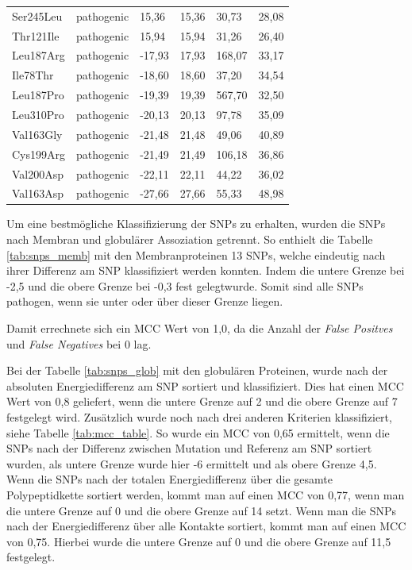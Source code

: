 \begin{table}[]
{\begin{tabular}{llllll}
        Ser245Leu & pathogenic & 15,36 & 15,36 & 30,73 & 28,08 \\
        \rowcolor[HTML]{FFCCC9} 
        Thr121Ile & pathogenic & 15,94 & 15,94 & 31,26 & 26,40 \\
        \rowcolor[HTML]{FFCCC9} 
        Leu187Arg & pathogenic & -17,93 & 17,93 & 168,07 & 33,17 \\
        \rowcolor[HTML]{FFCCC9} 
        Ile78Thr & pathogenic & -18,60 & 18,60 & 37,20 & 34,54 \\
        \rowcolor[HTML]{FFCCC9} 
        Leu187Pro & pathogenic & -19,39 & 19,39 & 567,70 & 32,50 \\
        \rowcolor[HTML]{FFCCC9} 
        Leu310Pro & pathogenic & -20,13 & 20,13 & 97,78 & 35,09 \\
        \rowcolor[HTML]{FFCCC9} 
        Val163Gly & pathogenic & -21,48 & 21,48 & 49,06 & 40,89 \\
        \rowcolor[HTML]{FFCCC9} 
        Cys199Arg & pathogenic & -21,49 & 21,49 & 106,18 & 36,86 \\
        \rowcolor[HTML]{FFCCC9} 
        Val200Asp & pathogenic & -22,11 & 22,11 & 44,22 & 36,02 \\
        \rowcolor[HTML]{FFCCC9} 
        Val163Asp & pathogenic & -27,66 & 27,66 & 55,33 & 48,98
    \end{tabular}}
\end{table}

Um eine bestmögliche Klassifizierung der \ac{SNP}s zu erhalten, wurden die \ac{SNP}s nach Membran und globulärer Assoziation getrennt. So enthielt die Tabelle \ref{tab:snps_memb} mit den Membranproteinen 13 \ac{SNP}s, welche eindeutig nach ihrer Differenz am \ac{SNP} klassifiziert werden konnten. Indem die untere Grenze bei -2,5 und die obere Grenze bei -0,3 fest gelegtwurde. Somit sind alle \ac{SNP}s pathogen, wenn sie unter oder über dieser Grenze liegen.

Damit errechnete sich ein MCC Wert von 1,0, da die Anzahl der \emph{False Positves} und \emph{False Negatives} bei 0 lag.

Bei der Tabelle \ref{tab:snps_glob} mit den globulären Proteinen, wurde nach der absoluten Energiedifferenz am \ac{SNP} sortiert und klassifiziert. Dies hat einen MCC Wert von 0,8 geliefert, wenn die untere Grenze auf 2 und die obere Grenze auf 7 festgelegt wird. Zusätzlich wurde noch nach drei anderen Kriterien klassifiziert, siehe Tabelle \ref{tab:mcc_table}. So wurde ein MCC von 0,65 ermittelt, wenn die \ac{SNP}s nach der Differenz zwischen Mutation und Referenz am \ac{SNP} sortiert wurden, als untere Grenze wurde hier -6 ermittelt und als obere Grenze 4,5. Wenn die \ac{SNP}s nach der totalen Energiedifferenz über die gesamte Polypeptidkette sortiert werden, kommt man auf einen MCC von 0,77, wenn man die untere Grenze auf 0 und die obere Grenze auf 14 setzt. Wenn man die \ac{SNP}s nach der Energiedifferenz über alle Kontakte sortiert, kommt man auf einen MCC von 0,75. Hierbei wurde die untere Grenze auf 0 und die obere Grenze auf 11,5 festgelegt.

